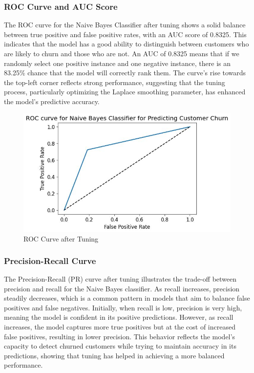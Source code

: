 \subsubsection{ROC Curve and AUC Score}
The ROC curve for the Naive Bayes Classifier after tuning shows a solid balance between true positive and false positive rates, with an AUC score of 0.8325. This indicates that the model has a good ability to distinguish between customers who are likely to churn and those who are not. An AUC of 0.8325 means that if we randomly select one positive instance and one negative instance, there is an 83.25\% chance that the model will correctly rank them. The curve’s rise towards the top-left corner reflects strong performance, suggesting that the tuning process, particularly optimizing the Laplace smoothing parameter, has enhanced the model’s predictive accuracy.

\begin{figure}[hbt!]
    \centering
    \includegraphics[width=1\linewidth]{Images/6.7c.jpg}
    \caption{ROC Curve after Tuning}
    \label{fig:enter-label}
\end{figure}

\subsubsection{Precision-Recall Curve}
The Precision-Recall (PR) curve after tuning illustrates the trade-off between precision and recall for the Naive Bayes classifier. As recall increases, precision steadily decreases, which is a common pattern in models that aim to balance false positives and false negatives. Initially, when recall is low, precision is very high, meaning the model is confident in its positive predictions. However, as recall increases, the model captures more true positives but at the cost of increased false positives, resulting in lower precision. This behavior reflects the model's capacity to detect churned customers while trying to maintain accuracy in its predictions, showing that tuning has helped in achieving a more balanced performance.

